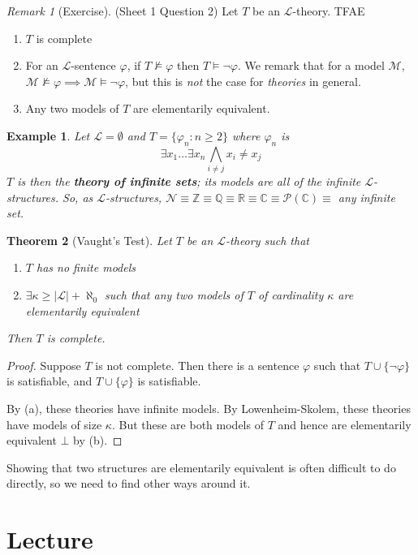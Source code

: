 \documentclass[]{article}
\theoremstyle{custhm}
\newtheorem{theorem}{Theorem}[section]
\theoremstyle{cusdef}
\theoremstyle{custhm}
\theoremstyle{custhm}
\theoremstyle{custhm}
\theoremstyle{ex}
\newtheorem{ex}[theorem]{Example}
\theoremstyle{custhm}
\theoremstyle{cusdef}
\theoremstyle{remark}
\newtheorem*{remark*}{Remark}
\theoremstyle{remark}
\theoremstyle{numremark}
\newcommand{\Z}{\mathbb{Z}}
\newcommand{\Q}{\mathbb{Q}}
\newcommand{\R}{\mathbb{R}}
\newcommand{\C}{\mathbb{C}}
\newcommand{\undf}[1]{\textit{\textbf{#1}}}
\renewcommand{\L}{\mathcal{L}}
\renewcommand{\it}[1]{\textit{#1}}
\newcommand{\M}{\mathcal{M}}
\renewcommand{\phi}{\varphi}
\newcommand{\N}{\mathcal{N}}
\begin{document}
\begin{remark*}[Exercise] (Sheet 1 Question 2) Let $T$ be an $\L$-theory. TFAE
\begin{enumerate}[label=\roman*)]
\item $T$ is complete
\item For an $\L$-sentence $\phi$, if $T\not\models \phi$ then $T\models \neg \phi$. We remark that for a model $\M$, $\M\not\models \phi\implies \M\models \neg \phi$, but this is \it{not} the case for \it{theories} in general.
\item Any two models of $T$ are elementarily equivalent.
\end{enumerate}
\end{remark*}
\begin{ex} Let $\L = \emptyset$ and $T = \{ \phi_n:n\ge 2 \}$ where $\phi_n$ is
	\[
	\exists x_1\dots\exists x_n \bigwedge_{i\ne j} x_i\ne x_j
	\]
	$T$ is then the \undf{theory of infinite sets}; its models are all of the infinite $\L$-structures. So, as $\L$-structures, $\N\equiv \Z\equiv \Q\equiv \R\equiv \C\equiv \mathcal{P}(\C) \equiv $ any infinite set.
\end{ex}

\begin{theorem}[Vaught's Test]
Let $T$ be an $\L$-theory such that
\begin{enumerate}[label=\alph*)]
\item $T$ has no finite models
\item $\exists \kappa \ge |\L| +\aleph_0$ such that any two models of $T$ of cardinality $\kappa$ are elementarily equivalent
\end{enumerate}
Then $T$ is complete.
\end{theorem}
\begin{proof}
Suppose $T$ is not complete. Then there is a sentence $\phi$ such that $T\cup\{\neg\phi\}$ is satisfiable, and $T\cup \{\phi\}$ is satisfiable.

By (a), these theories have infinite models. By Lowenheim-Skolem, these theories have models of size $\kappa$. But these are both models of $T$ and hence are elementarily equivalent $\bot$ by (b).
\end{proof}


Showing that two structures are elementarily equivalent is often difficult to do directly, so we need to find other ways around it.

\section{Lecture}
\end{document}
